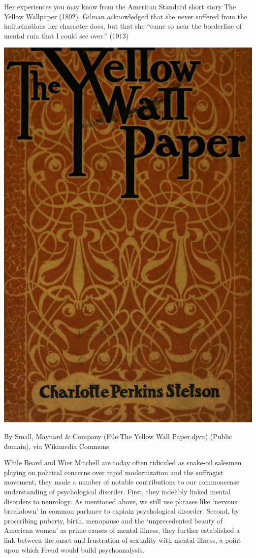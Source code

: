 \begin{refsection}
Her experiences you may know from the American Standard short story The Yellow Wallpaper (1892). Gilman acknowledged that she never suffered from the hallucinations her character does, but that she ``came so near the borderline of mental ruin that I could see over.'' (1913)
\begin{marginfigure}
 \begin{center}
     \includegraphics[scale=0.25]{../images/The_Yellow_Wall_Paper}
\end{center}
 \caption{By Small, Maynard \& Company (File:The Yellow Wall Paper.djvu) (Public domain), via Wikimedia Commons}
\label{fig: yellowwallpaper}
\end{marginfigure}
 

While Beard and Wier Mitchell are today often ridiculed as snake-oil salesmen playing on political concerns over rapid modernization and the suffragist movement, they made a number of notable contributions to our commonsense understanding of psychological disorder. First, they indelibly linked mental disorders to neurology. As mentioned above, we still use phrases like `nervous breakdown' in common parlance to explain psychological disorder. Second, by proscribing puberty, birth, menopause and the `unprecedented beauty of American women' as prime causes of mental illness, they further established a link between the onset and frustration of sexuality with mental illness, a point upon which Freud would build psychoanalysis.


\end{refsection}
